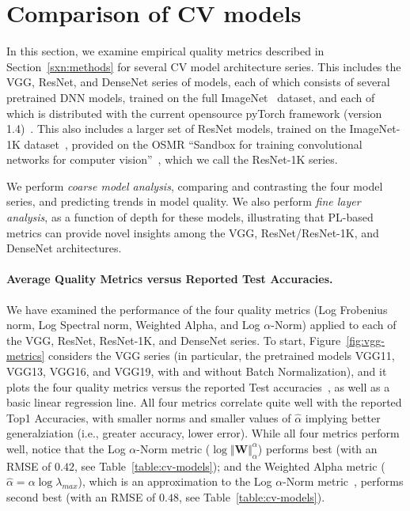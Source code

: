 \section{Comparison of CV models}
\label{sxn:cv}

In this section, we examine empirical quality metrics described in Section~\ref{sxn:methods} for several CV model architecture series.
This includes the VGG, ResNet, and DenseNet series of models, each of which consists of several pretrained DNN models, trained on the full ImageNet~\cite{imagenet} dataset, and each of which is distributed with the current opensource pyTorch framework (version 1.4)~\cite{pyTorch}.
This also includes a larger set of ResNet models, trained on the ImageNet-1K dataset~\cite{imagenet1k}, provided on the OSMR ``Sandbox for training convolutional networks for computer vision''~\cite{osmr}, which we call the ResNet-1K series.

We perform \emph{coarse model analysis}, comparing and contrasting the four model series, and predicting trends in model quality. 
We also perform \emph{fine layer analysis}, as a function of depth for these models, illustrating that PL-based metrics can provide novel insights among the VGG, ResNet/ResNet-1K, and DenseNet architectures. 

\paragraph{Average Quality Metrics versus Reported Test Accuracies.}
We have examined the performance of the four quality metrics (Log Frobenius norm, Log Spectral norm, Weighted Alpha, and Log $\alpha$-Norm) applied to each of the VGG, ResNet, ResNet-1K, and DenseNet series.
To start, Figure~\ref{fig:vgg-metrics} considers the VGG series (in particular, the pretrained models VGG11, VGG13, VGG16, and VGG19, with and without Batch Normalization), and it plots the four quality metrics versus the reported Test accuracies~\cite{pyTorchVgg}, as well as a basic linear regression line. 
All four metrics correlate quite well with the reported Top1 Accuracies, with smaller norms and smaller values of $\hat{\alpha}$ implying better generalziation (i.e., greater accuracy, lower error). 
While all four metrics perform well, notice that the Log $\alpha$-Norm metric ($\log\Vert\mathbf{W}\Vert_{\alpha}^{\alpha}$) performs best (with an RMSE of $0.42$, see Table~\ref{table:cv-models}); and the Weighted Alpha metric ($\hat\alpha =\alpha\log\lambda_{max} $), which is an approximation to the Log $\alpha$-Norm metric~\cite{MM20_unpub_work}, performs second best (with an RMSE of $0.48$, see Table~\ref{table:cv-models}).

